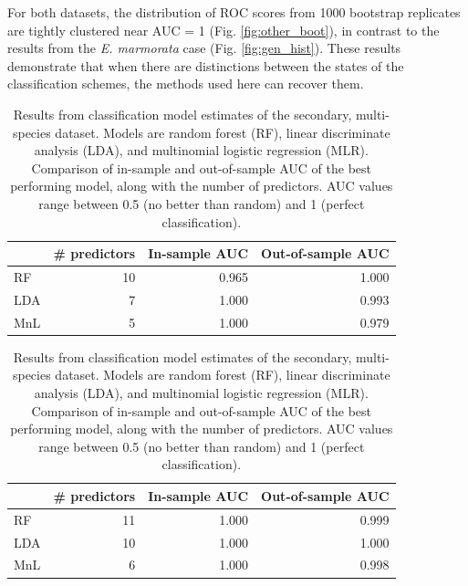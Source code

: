 \documentclass[12pt,letterpaper]{article}
\begin{document}
For both datasets, the distribution of ROC scores from 1000 bootstrap replicates are tightly clustered near AUC = 1 (Fig. \ref{fig:other_boot}), in contrast to the results from the \textit{E. marmorata} case (Fig. \ref{fig:gen_hist}). These results demonstrate that when there are distinctions between the states of the classification schemes, the methods used here can recover them.

\begin{table}[ht]
  \begin{subtable}[t]{\linewidth}
    \begin{tabular}{ l r r r }
      \hline
      & \# predictors & In-sample AUC & Out-of-sample AUC \\ 
      \hline
      \hline
      RF &   10 & 0.965 & 1.000 \\ 
      LDA &    7 & 1.000 & 0.993 \\ 
      MnL &    5 & 1.000 & 0.979 \\ 
      \hline
    \end{tabular}
  \end{subtable}

  \begin{subtable}[t]{\linewidth}
    \begin{tabular}{ l r r r }
      \hline
      & \# predictors & In-sample AUC & Out-of-sample AUC \\ 
      \hline
      \hline
      RF &   11 & 1.000 & 0.999 \\ 
      LDA &   10 & 1.000 & 1.000 \\ 
      MnL &    6 & 1.000 & 0.998 \\ 
      \hline
    \end{tabular}
  \end{subtable}
  \caption{Results from classification model estimates of the secondary, multi-species dataset. Models are random forest (RF), linear discriminate analysis (LDA), and multinomial logistic regression (MLR). Comparison of in-sample and out-of-sample AUC of the best performing model, along with the number of predictors. AUC values range between 0.5 (no better than random) and 1 (perfect classification).}
  \label{tab:second_res}
\end{table}
\end{document}
